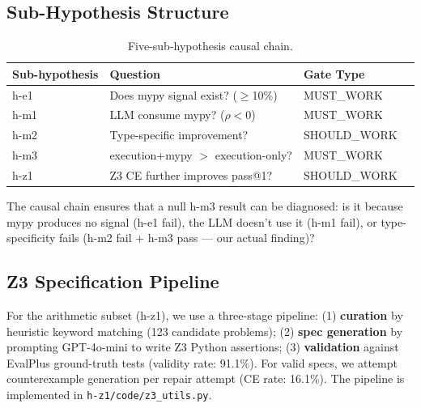 \subsection{Sub-Hypothesis Structure}

\begin{table}[h]
\centering
\caption{Five-sub-hypothesis causal chain.}
\label{tab:hypotheses}
\begin{tabular}{@{}llp{3.5cm}l@{}}
\toprule
Sub-hypothesis & Question & Gate Type \\
\midrule
h-e1 & Does mypy signal exist? ($\geq$10\%) & MUST\_WORK \\
h-m1 & LLM consume mypy? ($\rho < 0$) & MUST\_WORK \\
h-m2 & Type-specific improvement? & SHOULD\_WORK \\
h-m3 & execution+mypy $>$ execution-only? & MUST\_WORK \\
h-z1 & Z3 CE further improves pass@1? & SHOULD\_WORK \\
\bottomrule
\end{tabular}
\end{table}

The causal chain ensures that a null h-m3 result can be diagnosed: is it
because mypy produces no signal (h-e1 fail), the LLM doesn't use it (h-m1
fail), or type-specificity fails (h-m2 fail + h-m3 pass --- our actual finding)?

\subsection{Z3 Specification Pipeline}

For the arithmetic subset (h-z1), we use a three-stage pipeline: (1)
\textbf{curation} by heuristic keyword matching (123 candidate problems); (2)
\textbf{spec generation} by prompting GPT-4o-mini to write Z3 Python assertions;
(3) \textbf{validation} against EvalPlus ground-truth tests (validity rate:
91.1\%). For valid specs, we attempt counterexample generation per repair
attempt (CE rate: 16.1\%). The pipeline is implemented in
\texttt{h-z1/code/z3\_utils.py}.
